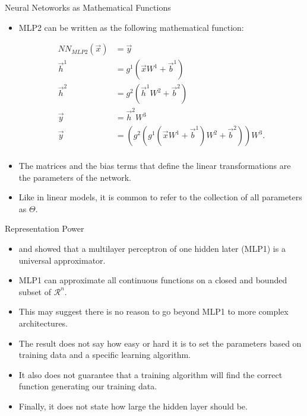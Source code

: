 \documentclass[handout]{beamer}
\begin{document}
\begin{frame}{Neural Netoworks as Mathematical Functions}
\begin{scriptsize}
\begin{itemize}
\item MLP2 can be written as the following mathematical function:
\begin{center}
\begin{equation}
\begin{split}
NN_{MLP2}(\vec{x}) & =  \vec{y}  \\
\vec{h}^{1} &  = g^{1}(\vec{x}W^{1}+\vec{b}^{1}) \\
\vec{h}^{2} &  = g^{2}(\vec{h}^{1}W^{2}+\vec{b}^{2}) \\
\vec{y} &  = \vec{h}^{2}W^{3}\\
\vec{y} &  = (g^2(g^1(\vec{x}W^{1}+\vec{b}^{1})W^2+\vec{b}^2))W^3.\\
\end{split}
\end{equation}
\end{center}
\item The matrices and the bias terms that define the linear transformations are the parameters of the network. 
\item Like in linear models, it is common to refer to the collection of all parameters as $\Theta$.
\end{itemize}
\end{scriptsize}
\end{frame}



\begin{frame}{Representation Power}
\begin{scriptsize}
\begin{itemize}
\item \cite{hornik1989multilayer} and \cite{cybenko1989approximation} showed that a multilayer perceptron of one hidden later (MLP1) is a universal approximator.
\item MLP1 can approximate all continuous functions on a closed and bounded subset of $\mathcal{R}^n$.
\item This may suggest there is no reason to go beyond MLP1 to more complex architectures.
\item The result does not say how easy or hard it is to set the parameters based on training data and a specific learning algorithm.
\item It also does not guarantee that a training algorithm will find
the correct function generating our training data.
\item Finally, it does not state how large the hidden layer should be.
\end{itemize}


\end{scriptsize}
\end{frame}
\end{document}
